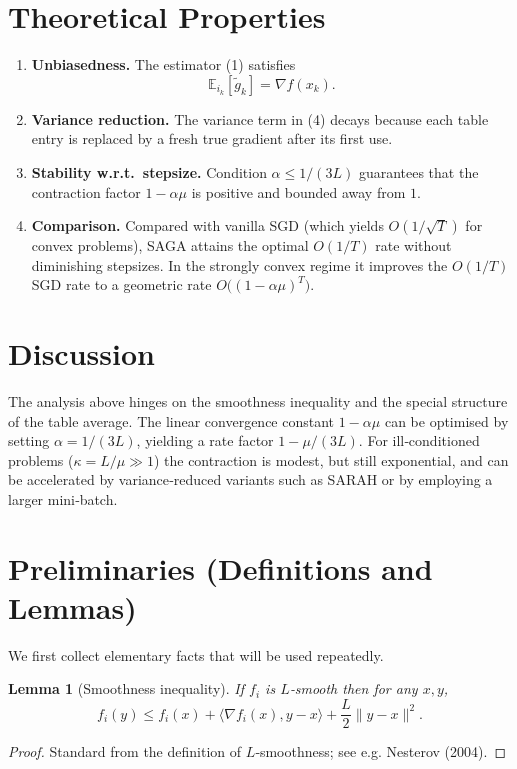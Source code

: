 \documentclass[11pt]{article}
\newtheorem{lemma}{Lemma}[section]
\begin{document}
\section*{Theoretical Properties}
\begin{enumerate}[label=\arabic*.]
\item \textbf{Unbiasedness.} The estimator (1) satisfies
\[
\mathbb{E}_{i_k}[\tilde g_k]=\nabla f(x_k).
\tag{8}
\]
\item \textbf{Variance reduction.} The variance term in (4) decays because each table entry is replaced by a fresh true gradient after its first use.
\item \textbf{Stability w.r.t.\ stepsize.} Condition $\alpha\le 1/(3L)$ guarantees that the contraction factor $1-\alpha\mu$ is positive and bounded away from $1$.
\item \textbf{Comparison.} Compared with vanilla SGD (which yields $O(1/\sqrt{T})$ for convex problems), SAGA attains the optimal $O(1/T)$ rate without diminishing stepsizes. In the strongly convex regime it improves the $O(1/T)$ SGD rate to a geometric rate $O\bigl((1-\alpha\mu)^T\bigr)$.
\end{enumerate}
\section*{Discussion}
The analysis above hinges on the smoothness inequality and the special structure of the table average. The linear convergence constant $1-\alpha\mu$ can be optimised by setting $\alpha=1/(3L)$, yielding a rate factor $1-\mu/(3L)$. For ill‑conditioned problems ($\kappa=L/\mu\gg1$) the contraction is modest, but still exponential, and can be accelerated by variance‑reduced variants such as SARAH or by employing a larger mini‑batch.

\section*{Preliminaries (Definitions and Lemmas)}
We first collect elementary facts that will be used repeatedly.

\begin{lemma}[Smoothness inequality]\label{lem:smooth}
If $f_i$ is $L$‑smooth then for any $x,y$,
\[
f_i(y)\le f_i(x)+\langle\nabla f_i(x),y-x\rangle+\frac{L}{2}\|y-x\|^2 .
\tag{9}
\]
\end{lemma}
\begin{proof}
Standard from the definition of $L$‑smoothness; see e.g. Nesterov (2004). \qedhere
\end{proof}
\end{document}
